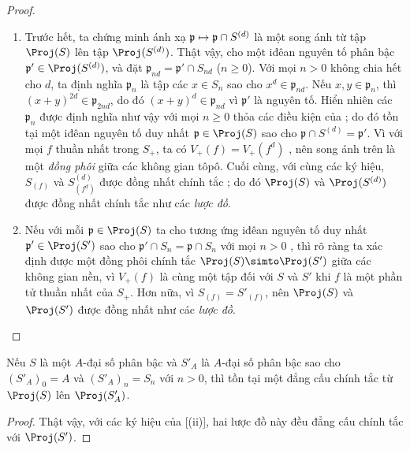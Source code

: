 \documentclass[oneside,10pt]{amsart}
\makeatletter
\renewcommand{\geq}{\geqslant}
\newcommand{\ega@arrow}[2]{\mathchoice{#1}{#2}{#2}{#2}}
\let\ega@shortmapsto\mapsto
\renewcommand{\mapsto}{\ega@arrow{\longmapsto}{\ega@shortmapsto}}
\let\EGAOriginalLabel\label
\renewcommand{\label}[1]{\phantomsection\EGAOriginalLabel{#1}}
\makeatother
\begin{document}
\begin{proof}
\medskip\noindent
\begin{enumerate}
  \item[\rm(i)] Trước hết, ta chứng minh ánh xạ $\mathfrak{p}\mapsto\mathfrak{p}\cap S^{(d)}$ là một song ánh từ tập $\Proj(S)$ lên tập $\Proj(S^{(d)})$.
  Thật vậy, cho một iđêan nguyên tố phân bậc $\mathfrak{p}'\in\Proj(S^{(d)})$, và đặt $\mathfrak{p}_{nd}=\mathfrak{p}'\cap S_{nd}$ ($n\geq0$).
  Với mọi $n>0$ không chia hết cho $d$, ta định nghĩa $\mathfrak{p}_n$ là tập các $x\in S_n$ sao cho $x^d\in\mathfrak{p}_{nd}$.
  Nếu $x,y\in\mathfrak{p}_n$, thì $(x+y)^{2d}\in\mathfrak{p}_{2nd}$, do đó $(x+y)^d\in\mathfrak{p}_{nd}$ vì $\mathfrak{p}'$ là nguyên tố.
  Hiển nhiên các $\mathfrak{p}_n$ được định nghĩa như vậy với mọi $n\geq0$ thỏa các điều kiện của ; do đó tồn tại một iđêan nguyên tố duy nhất $\mathfrak{p}\in\Proj(S)$ sao cho $\mathfrak{p}\cap S^{(d)}=\mathfrak{p}'$.
  Vì với mọi $f$ thuần nhất trong $S_+$, ta có $V_+(f)=V_+(f^d)$ , nên song ánh trên là một \emph{đồng phôi} giữa các không gian tôpô.
  Cuối cùng, với cùng các ký hiệu, $S_{(f)}$ và $S^{(d)}_{(f^d)}$ được đồng nhất chính tắc ; do đó $\Proj(S)$ và $\Proj(S^{(d)})$ được đồng nhất chính tắc như các \emph{lược đồ}.
  \item[\rm(ii)] Nếu với mỗi $\mathfrak{p}\in\Proj(S)$ ta cho tương ứng iđêan nguyên tố duy nhất $\mathfrak{p}'\in\Proj(S')$ sao cho $\mathfrak{p}'\cap S_n=\mathfrak{p}\cap S_n$ với mọi $n>0$ , thì rõ ràng ta xác định được một đồng phôi chính tắc $\Proj(S)\simto\Proj(S')$ giữa các không gian nền, vì $V_+(f)$ là cùng một tập đối với $S$ và $S'$ khi $f$ là một phần tử thuần nhất của $S_+$.
  Hơn nữa, vì $S_{(f)}=S'_{(f)}$, nên $\Proj(S)$ và $\Proj(S')$ được đồng nhất như các \emph{lược đồ}.
\end{enumerate}
\end{proof}

\begin{corollary}[2.4.8]
\label{II.2.4.8}
Nếu $S$ là một $A$-đại số phân bậc và $S'_A$ là $A$-đại số phân bậc sao cho $(S'_A)_0=A$ và $(S'_A)_n=S_n$ với $n>0$, thì tồn tại một đẳng cấu chính tắc từ $\Proj(S)$ lên $\Proj(S'_A)$.
\end{corollary}

\begin{proof}
Thật vậy, với các ký hiệu của [(ii)], hai lược đồ này đều đẳng cấu chính tắc với $\Proj(S')$.
\end{proof}
\end{document}
